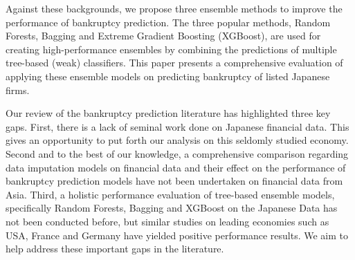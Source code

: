 Against these backgrounds, we propose three ensemble methods to improve the performance of bankruptcy prediction. The three popular methods, Random Forests, Bagging and Extreme Gradient Boosting (XGBoost), are used for creating high-performance ensembles by combining the predictions of multiple tree-based (weak) classifiers. This paper presents a comprehensive evaluation of applying these ensemble models on predicting bankruptcy of listed Japanese firms.

Our review of the bankruptcy prediction literature has highlighted three key gaps. First, there is a lack of seminal work done on Japanese financial data. This gives an opportunity to put forth our analysis on this seldomly studied economy. Second and to the best of our knowledge, a comprehensive comparison regarding data imputation models on financial data and their effect on the performance of bankruptcy prediction models have not been undertaken on financial data from Asia.
Third, a holistic performance evaluation of tree-based ensemble models, specifically Random Forests, Bagging and XGBoost on the Japanese Data has not been conducted before, but similar studies on leading economies such as USA, France and Germany have yielded positive performance results. We aim to help address these important gaps in the literature.



